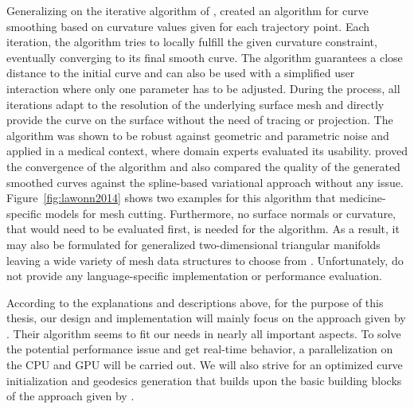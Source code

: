 \documentclass{stdlocal}
\begin{document}
Generalizing on the iterative algorithm of \textcite{martinez2005}, \textcite{lawonn2014} created an algorithm for curve smoothing based on curvature values given for each trajectory point.
Each iteration, the algorithm tries to locally fulfill the given curvature constraint, eventually converging to its final smooth curve.
The algorithm guarantees a close distance to the initial curve and can also be used with a simplified user interaction where only one parameter has to be adjusted.
During the process, all iterations adapt to the resolution of the underlying surface mesh and directly provide the curve on the surface without the need of tracing or projection.
The algorithm was shown to be robust against geometric and parametric noise and applied in a medical context, where domain experts evaluated its usability.
\textcite{lawonn2014} proved the convergence of the algorithm and also compared the quality of the generated smoothed curves against the spline-based variational approach without any issue.
Figure~\ref{fig:lawonn2014} shows two examples for this algorithm that medicine-specific models for mesh cutting.
Furthermore, no surface normals or curvature, that would need to be evaluated first, is needed for the algorithm.
As a result, it may also be formulated for generalized two-dimensional triangular manifolds leaving a wide variety of mesh data structures to choose from \autocite{guibas1985}.
Unfortunately, \textcite{lawonn2014} do not provide any language-specific implementation or performance evaluation.

According to the explanations and descriptions above, for the purpose of this thesis, our design and implementation will mainly focus on the approach given by \textcite{lawonn2014}.
Their algorithm seems to fit our needs in nearly all important aspects.
To solve the potential performance issue and get real-time behavior, a parallelization on the CPU and GPU will be carried out.
We will also strive for an optimized curve initialization and geodesics generation that builds upon the basic building blocks of the approach given by \textcite{mancinelli2022}.


\end{document}
